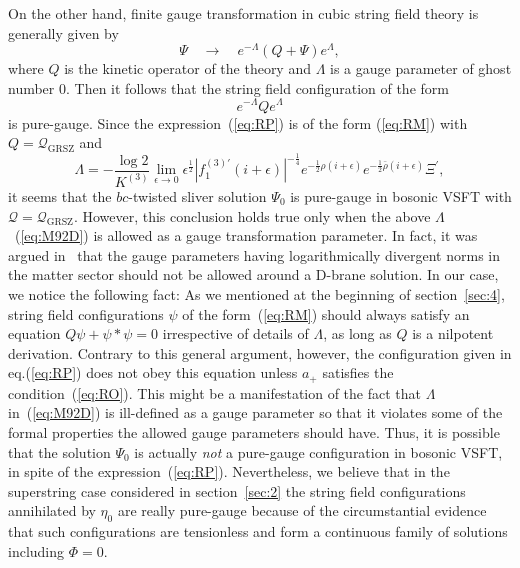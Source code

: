 \documentclass[a4paper,12pt]{article}
\newcommand{\cQ}{\mathcal{Q}}
\newcommand{\Qmid}{\cQ_{\mathrm{GRSZ}}}
\begin{document}
On the other hand, finite gauge transformation in 
cubic string field theory is generally given by 
\begin{equation}
\Psi \quad \longrightarrow \quad e^{-\Lambda}(Q+\Psi)e^{\Lambda}, \label{eq:RL}
\end{equation}
where $Q$ is the kinetic operator of the theory and $\Lambda$ is a gauge parameter of ghost number 0. 
Then it follows that the string field configuration of the form 
\begin{equation}
e^{-\Lambda}Qe^{\Lambda} \label{eq:RM}
\end{equation}
is pure-gauge. 
Since the expression~(\ref{eq:RP}) 
is of the form (\ref{eq:RM}) with $Q=\Qmid$ and 
\begin{equation}
\Lambda=-\frac{\log 2}{K^{(3)}}
\lim_{\epsilon\to 0}\epsilon^{\frac{1}{2}}|f^{(3)\prime}_1(i+\epsilon)|^{-\frac{1}{4}}e^{-\frac{1}{2}
\rho(i+\epsilon)}e^{-\frac{1}{2}\bar{\rho}(i+\epsilon)}\Xi^{\prime}, \label{eq:M92D}
\end{equation}
it seems that the $bc$-twisted sliver solution $\Psi_0$ is pure-gauge in bosonic VSFT with 
$\cQ=\Qmid$. However, this conclusion holds true only when the above $\Lambda$~(\ref{eq:M92D}) 
is allowed as a 
gauge transformation parameter. In fact, it was argued in~\cite{RSZ4} that 
the gauge parameters having logarithmically divergent norms in the matter sector should 
not be allowed around a D-brane solution. In our case, we notice the following fact: 
As we mentioned at the beginning of section~\ref{sec:4}, string field configurations $\psi$ of the 
form~(\ref{eq:RM}) should always satisfy an equation $Q\psi+\psi *\psi=0$ irrespective of 
details of $\Lambda$, as long as $Q$ is a nilpotent derivation. Contrary to this general argument, 
however, the configuration given in eq.(\ref{eq:RP}) does not obey this equation unless $a_+$ 
satisfies the condition~(\ref{eq:RO}). 
This might be a manifestation of the fact that $\Lambda$ in~(\ref{eq:M92D}) is ill-defined as a 
gauge parameter so that it violates some of the formal properties the allowed gauge parameters 
should have. Thus, it is possible that the solution 
$\Psi_0$ is actually \textit{not} a pure-gauge 
configuration in bosonic VSFT, in spite of the expression~(\ref{eq:RP}). 
Nevertheless, we believe that in the superstring case 
considered in section~\ref{sec:2} the string field configurations annihilated by $\eta_0$ are 
really pure-gauge because of the circumstantial evidence that such configurations are tensionless 
and form a continuous family of solutions including $\Phi=0$. 
\end{document}
